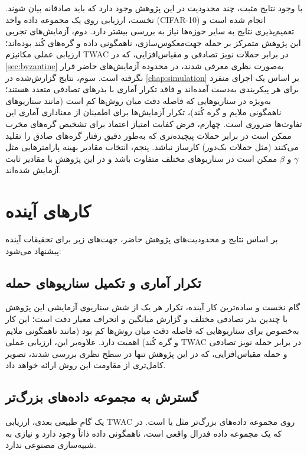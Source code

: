 با وجود نتایج مثبت، چند محدودیت در این پژوهش وجود دارد که باید صادقانه بیان شوند. نخست، ارزیابی روی یک مجموعه داده واحد (\gls{CIFAR}-10) انجام شده است و تعمیم‌پذیری نتایج به سایر حوزه‌ها نیاز به بررسی بیشتر دارد. دوم، آزمایش‌های تجربی این پژوهش متمرکز بر حمله جهت‌معکوس‌سازی، ناهمگونی داده و گره‌های کُند بوده‌اند؛ ارزیابی عملی مکانیزم \gls{TWAC} در برابر حملات نویز تصادفی و مقیاس‌افزایی، که در \autoref{sec:byzantine} به‌صورت نظری معرفی شدند، در محدوده آزمایش‌های حاضر قرار نگرفته است. سوم، نتایج گزارش‌شده در \autoref{chap:simulation} بر اساس یک اجرای منفرد برای هر پیکربندی به‌دست آمده‌اند و فاقد تکرار آماری با بذرهای تصادفی متعدد هستند؛ به‌ویژه در سناریوهایی که فاصله دقت میان روش‌ها کم است (مانند سناریوهای ناهمگونی ملایم و گره کُند)، تکرار آزمایش‌ها برای اطمینان از معناداری آماری این تفاوت‌ها ضروری است. چهارم، فرض کفایت امتیاز اعتماد برای تشخیص گره‌های مخرب ممکن است در برابر حملات پیچیده‌تری که به‌طور دقیق رفتار گره‌های صادق را تقلید می‌کنند (مثل حملات بک‌دور) کارساز نباشد. پنجم، انتخاب مقادیر بهینه پارامترهایی مثل $\gamma$ و $\beta$ ممکن است در سناریوهای مختلف متفاوت باشد و در این پژوهش با مقادیر ثابت آزمایش شده‌اند.


\section{کارهای آینده}
\label{sec:futurework}

بر اساس نتایج و محدودیت‌های پژوهش حاضر، جهت‌های زیر برای تحقیقات آینده پیشنهاد می‌شود:

\subsection{تکرار آماری و تکمیل سناریوهای حمله}

گام نخست و ساده‌ترین کار آینده، تکرار هر یک از شش سناریوی آزمایشی این پژوهش با چندین بذر تصادفی مختلف و گزارش میانگین و انحراف معیار دقت است؛ این کار به‌خصوص برای سناریوهایی که فاصله دقت میان روش‌ها کم بود (مانند ناهمگونی ملایم و گره کُند) اهمیت دارد. علاوه‌بر این، ارزیابی عملی \gls{TWAC} در برابر حمله نویز تصادفی و حمله مقیاس‌افزایی، که در این پژوهش تنها در سطح نظری بررسی شدند، تصویر کامل‌تری از مقاومت این روش ارائه خواهد داد.

\subsection{گسترش به مجموعه داده‌های بزرگ‌تر}

یک گام طبیعی بعدی، ارزیابی \gls{TWAC} روی مجموعه داده‌های بزرگ‌تر مثل  یا  است. در  که یک مجموعه داده فدرال واقعی است، ناهمگونی داده ذاتاً وجود دارد و نیازی به شبیه‌سازی مصنوعی ندارد.

